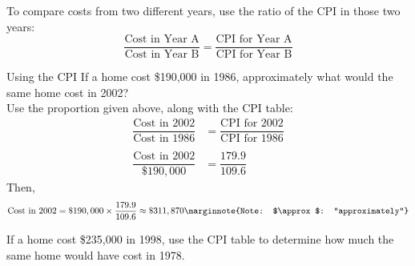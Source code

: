 To compare costs from two different years, use the ratio of the CPI in those two years:
\[\dfrac{\textrm{Cost in Year A}}{\textrm{Cost in Year B}} = \dfrac{\textrm{CPI for Year A}}{\textrm{CPI for Year B}}\]

\begin{example}[https://www.youtube.com/watch?v=tJS3kwwr8XA]{Using the CPI}
If a home cost \$190,000 in 1986, approximately what would the same home cost in 2002?\\

Use the proportion given above, along with the CPI table:
\begin{align*}
\dfrac{\textrm{Cost in 2002}}{\textrm{Cost in 1986}} &= \dfrac{\textrm{CPI for 2002}}{\textrm{CPI for 1986}}\\
&\\
\dfrac{\textrm{Cost in 2002}}{\$190,000} &= \dfrac{179.9}{109.6}
\end{align*}
Then, \[\textrm{Cost in 2002} = \$190,000 \times \dfrac{179.9}{109.6} \approx \$311,870\marginnote{Note: $\approx$: ``approximately''}\]
\end{example}

\begin{try}
If a home cost \$235,000 in 1998, use the CPI table to determine how much the same home would have cost in 1978.
\end{try}


